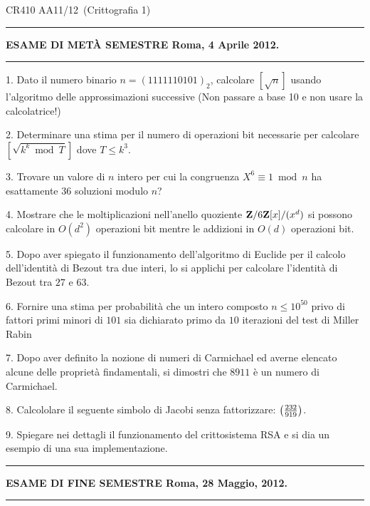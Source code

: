 \centerline{CR410 AA11/12\ (Crittografia 1)}\bigskip
\bigskip

\hrule
\centerline{{\bf ESAME DI MET\`{A} SEMESTRE \hfill Roma, 4 Aprile 2012.}} \hrule

\item{1.} Dato il numero binario
$n=(1111110101)_2$, calcolare $[\sqrt{n}]$  usando l'algoritmo
delle approssimazioni successive (Non passare a base 10 e  non
usare la calcolatrice!)

\item{2.} Determinare una stima per il numero di operazioni bit necessarie per calcolare\hfill\break $[{\sqrt{k^k\bmod T}}]$ dove
$T\leq k^3$. 
\item{3.} Trovare un valore di $n$ intero per cui la congruenza $X^6\equiv 1\bmod n$ ha esattamente $36$ soluzioni modulo $n$?
\item{4.} Mostrare che le moltiplicazioni nell’anello quoziente ${\bf Z}/6{\bf Z}[x]/(x^d)$ si possono calcolare in $O(d^2)$ operazioni bit mentre le
addizioni in $O(d)$ operazioni bit.
\item{5.} Dopo aver spiegato il funzionamento dell'algoritmo di Euclide per il calcolo dell'identi\-t\`a di Bezout
tra due interi, lo si applichi per calcolare l'identit\`a di Bezout tra $27$ e $63$.
\item{6.} Fornire una stima per probabilit\`{a} che un intero composto $n\leq 10^{50}$ privo di fattori primi minori di $101$ sia 
dichiarato primo da $10$ iterazioni del test di Miller Rabin
\item{7.} Dopo aver definito la nozione di numeri di Carmichael ed averne elencato alcune delle propriet\`a findamentali,
si dimostri che $8911$ \`e un numero di Carmichael.
\item{8.} Calcololare il seguente simbolo di Jacobi senza fattorizzare: $\left({232\over919}\right)$.
\item{9.} Spiegare nei dettagli il funzionamento del crittosistema RSA e si dia un esempio di una sua implementazione.
\bigskip

\hrule
\centerline{{\bf ESAME DI FINE SEMESTRE \hfill Roma, 28 Maggio, 2012.}}\hrule
 
